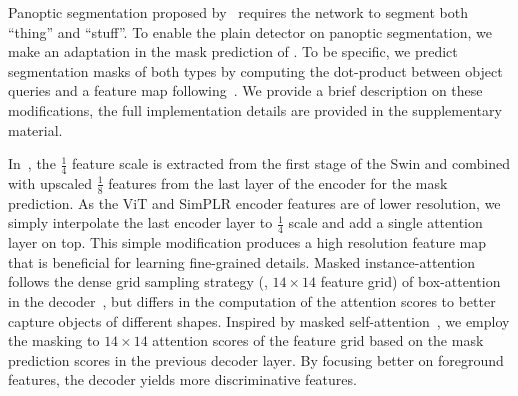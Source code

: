  Panoptic segmentation proposed by~\cite{kirillov2019panoptic} requires the network to segment both ``thing'' and ``stuff''.
To enable the plain detector on panoptic segmentation, we make an adaptation in the mask prediction of \ours. To be specific, we predict segmentation masks of both types by computing the dot-product between object queries and a feature map following~\cite{cheng2022mask2former}. We provide a brief description on these modifications, the full implementation details are provided in the supplementary material.

In~\cite{cheng2022mask2former}, the $\frac{1}{4}$ feature scale is extracted from the first stage of the Swin and combined with upscaled $\frac{1}{8}$ features from the last layer of the encoder for the mask prediction. As the ViT and SimPLR encoder features are of lower resolution, we simply interpolate the last encoder layer to $\frac{1}{4}$ scale and add a single attention layer on top. This simple modification produces a high resolution feature map that is beneficial for learning fine-grained details.
%
Masked instance-attention follows the dense grid sampling strategy (\eg, $14\times14$ feature grid) of box-attention in the decoder~\cite{nguyen2022boxer}, but differs in the computation of the attention scores to better capture objects of different shapes. Inspired by masked self-attention~\cite{cheng2022mask2former}, we employ the masking to $14\times14$ attention scores of the feature grid based on the mask prediction scores in the previous decoder layer. By focusing better on foreground features, the decoder yields more discriminative features.


